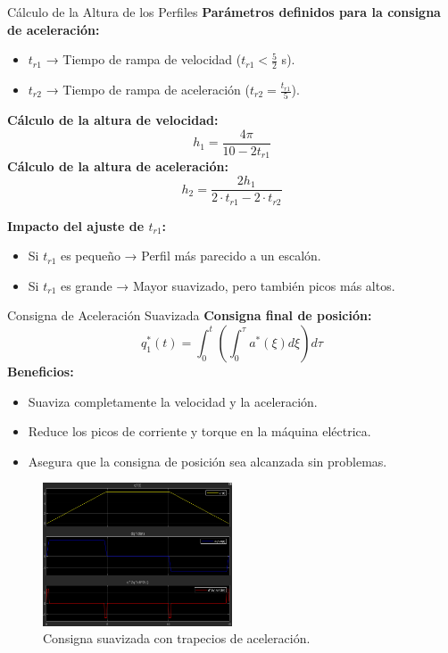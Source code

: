 \documentclass[12pt]{beamer}
\begin{document}
\begin{frame}{Cálculo de la Altura de los Perfiles} 
    \textbf{Parámetros definidos para la consigna de aceleración:}
    \begin{itemize}
        \item \( t_{r1} \) → Tiempo de rampa de velocidad (\( t_{r1} < \frac{5}{2} \) s).
        \item \( t_{r2} \) → Tiempo de rampa de aceleración (\( t_{r2} = \frac{t_{r1}}{5} \)).
    \end{itemize}

    \textbf{Cálculo de la altura de velocidad:}
    \[
    h_1 = \frac{4 \pi}{10 - 2 t_{r1}}
    \]
    \textbf{Cálculo de la altura de aceleración:}
    \[
    h_2 = \frac{2h_1}{2\cdot t_{r1} - 2\cdot t_{r2}}
    \]
    
    \textbf{Impacto del ajuste de \( t_{r1} \):}
    \begin{itemize}
        \item Si \( t_{r1} \) es pequeño → Perfil más parecido a un escalón.
        \item Si \( t_{r1} \) es grande → Mayor suavizado, pero también picos más altos.
    \end{itemize}
\end{frame}

\begin{frame}{Consigna de Aceleración Suavizada}\scriptsize
    \textbf{Consigna final de posición:}
    \[
    q_1^*(t) = \int_0^t \left( \int_0^\tau a^*(\xi) d\xi \right) d\tau
    \]
    \textbf{Beneficios:}
    \begin{itemize}
        \item Suaviza completamente la velocidad y la aceleración.
        \item Reduce los picos de corriente y torque en la máquina eléctrica.
        \item Asegura que la consigna de posición sea alcanzada sin problemas.
    \end{itemize}

    \begin{figure}
        \centering
        \includegraphics[width=0.5\textwidth]{Imagenes/AceleracionTrapezoidal.png}
        \caption{Consigna suavizada con trapecios de aceleración.}
        \label{fig:AceleracionTrapezoidal}
    \end{figure}
\end{frame}
\end{document}
